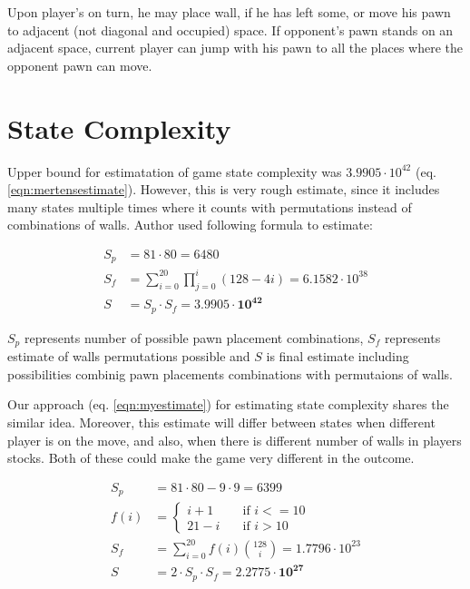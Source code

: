 Upon player's on turn, he may place wall, if he has left some, or move
his pawn to adjacent (not diagonal and occupied) space.
If opponent's pawn stands on an adjacent space, current player can jump
with his pawn to all the places where the opponent pawn can move.

\section{State Complexity}
Upper bound for estimatation of game state complexity was $3.9905\cdot10^{42}$
\cite{mertens} (eq. \ref{eqn:mertensestimate}). However, this is very
rough estimate, since it includes many states multiple times where it counts
with permutations instead of combinations of walls. Author used following
formula to estimate:

\begin{center}
  \vspace*{-1.60cm}
  \begin{equation}
    \label{eqn:mertensestimate}
    \begin{aligned}
      S_p\!&=\!81 \cdot 80 = 6480 \\
      S_f\!&=\!\sum_{i=0}^{20}\prod_{j=0}^{i}(128 - 4i)\!=\!6.1582{\cdot}10^{38} \\
      S\!&=\!S_p \cdot S_f = \mathbf{3.9905 \cdot 10 ^{42}}
    \end{aligned}
  \end{equation}
  \vspace*{-1.05cm}
\end{center}

$S_p$ represents number of possible pawn placement combinations, $S_f$
represents estimate of walls permutations possible and $S$ is final
estimate including possibilities combinig pawn placements combinations with
permutaions of walls.

Our approach (eq. \ref{eqn:myestimate}) for estimating state complexity
shares the similar idea.
Moreover, this estimate will differ between states when different
player is on the move, and also, when there is different number of walls
in players stocks. Both of these could make the game very different
in the outcome.
\begin{center}
  \vspace*{-1.30cm}
  \begin{equation}
    \label{eqn:myestimate}
    \begin{aligned}
      S_p &= 81 {\cdot} 80 - 9 {\cdot} 9 = 6399\\[-0.20cm]
      f(i)\!&=\! \begin{cases}
        i + 1  & \quad \text{if } i <= 10 \\[-0.30cm]
        21 - i & \quad \text{if } i > 10
      \end{cases}\\
      S_f\! &=\! \sum_{i=0}^{20} f(i){128 \choose i} = 1.7796 {\cdot} 10^{23}
      \\
      S &= 2 {\cdot} S_p {\cdot} S_f = \mathbf{2.2775{\cdot}10^{27}}
    \end{aligned}
  \end{equation}
  \vspace*{-1.15cm}
\end{center}


